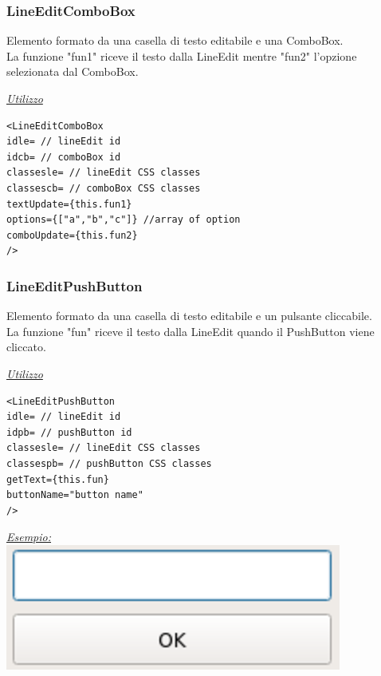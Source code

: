 \subsubsection{LineEditComboBox}
Elemento formato da una casella di testo editabile e una ComboBox.\\
La funzione "fun1" riceve il testo dalla LineEdit mentre "fun2" l'opzione selezionata dal ComboBox.
\begin{center}
\underline{\textit{Utilizzo}}
\begin{lstlisting}
<LineEditComboBox
idle= // lineEdit id
idcb= // comboBox id
classesle= // lineEdit CSS classes
classescb= // comboBox CSS classes
textUpdate={this.fun1}
options={["a","b","c"]} //array of option
comboUpdate={this.fun2}
/>
\end{lstlisting}
\end{center}

\subsubsection{LineEditPushButton}
Elemento formato da una casella di testo editabile e un pulsante cliccabile.\\
La funzione "fun" riceve il testo dalla LineEdit quando il PushButton viene cliccato.
\begin{center}
\underline{\textit{Utilizzo}}
\begin{lstlisting}
<LineEditPushButton
idle= // lineEdit id
idpb= // pushButton id
classesle= // lineEdit CSS classes
classespb= // pushButton CSS classes
getText={this.fun}
buttonName="button name"
/>
\end{lstlisting}
\underline{\textit{Esempio:}}
\\
\includegraphics[scale=0.75]{img/LEPush.png}
\\
\end{center}
\newpage

